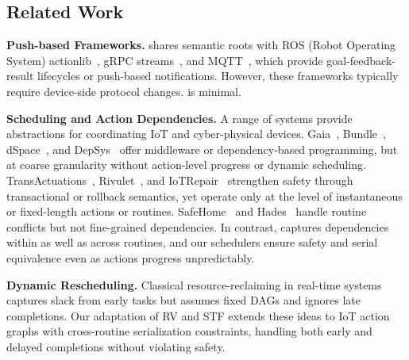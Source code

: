 \subsection{Related Work}
\label{rasc:sec:related-work}

\noindent \textbf{Push-based Frameworks.}
\abs{} shares semantic roots with ROS (Robot Operating System) actionlib~\cite{ros_actionlib}, gRPC streams~\cite{grpc_streaming}, and MQTT~\cite{mqtt_v5}, which provide goal-feedback-result lifecycles or push-based notifications. However, these frameworks typically require device-side protocol changes. \abs{} is minimal.

\noindent \textbf{Scheduling and Action Dependencies.}  
A range of systems provide abstractions for coordinating IoT and cyber-physical devices. 
Gaia~\cite{gaia}, Bundle~\cite{vicaire2010bundle}, dSpace~\cite{fu2021dspace}, and DepSys~\cite{DepSys} offer middleware or dependency-based programming, but at coarse granularity without action-level progress or dynamic scheduling. 
TransActuations~\cite{Transactuations}, Rivulet~\cite{rivulet}, and IoTRepair~\cite{iotrepair2020} strengthen safety through transactional or rollback semantics, yet operate only at the level of instantaneous or fixed-length actions or routines. 
SafeHome~\cite{SafeHomeEuroSys2021} and Hades~\cite{hades} handle routine conflicts but not fine-grained dependencies. 
In contrast, \sysname{} captures dependencies within as well as across routines, and our schedulers ensure safety and serial equivalence even as actions progress unpredictably.

\noindent \textbf{Dynamic Rescheduling.}  
Classical resource-reclaiming
in real-time systems~\cite{shen1993resource,manimaran1997new,gupta2000new} captures slack from early tasks 
but assumes fixed DAGs and ignores late completions. 
Our adaptation of RV and STF extends these ideas to IoT action graphs with cross-routine serialization constraints, handling both early and delayed completions without violating safety.

